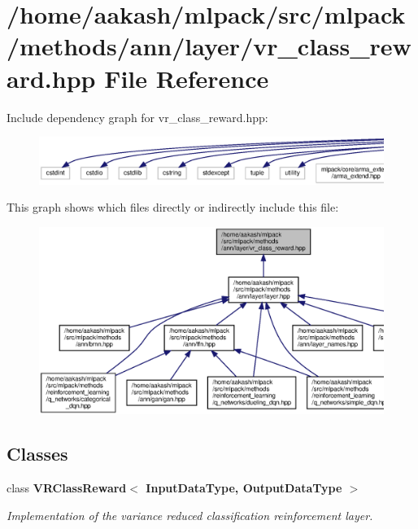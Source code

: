 \section{/home/aakash/mlpack/src/mlpack/methods/ann/layer/vr\+\_\+class\+\_\+reward.hpp File Reference}
\label{vr__class__reward_8hpp}
Include dependency graph for vr\+\_\+class\+\_\+reward.\+hpp\+:
\nopagebreak
\begin{figure}[H]
\begin{center}
\leavevmode
\includegraphics[width=350pt]{vr__class__reward_8hpp__incl}
\end{center}
\end{figure}
This graph shows which files directly or indirectly include this file\+:
\nopagebreak
\begin{figure}[H]
\begin{center}
\leavevmode
\includegraphics[width=350pt]{vr__class__reward_8hpp__dep__incl}
\end{center}
\end{figure}
\subsection*{Classes}
\begin{DoxyCompactItemize}
\item 
class \textbf{ V\+R\+Class\+Reward$<$ Input\+Data\+Type, Output\+Data\+Type $>$}
\begin{DoxyCompactList}\small\item\em Implementation of the variance reduced classification reinforcement layer. \end{DoxyCompactList}\end{DoxyCompactItemize}
